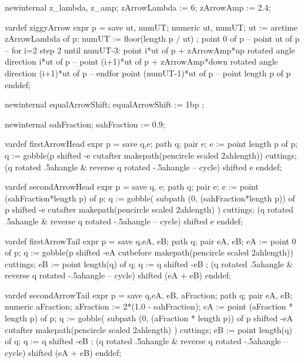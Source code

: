   newinternal z_lambda, z_amp;
  zArrowLambda := 6;   %
  zArrowAmp    := 2.4; %

  vardef ziggyArrow expr p = 
    save ut, numUT; numeric ut, numUT;    
    ut    := arctime zArrowLambda of p;
    numUT := floor(length p / ut) ;
    point 0 of p -- point ut of p --
      for i=2 step 2 until numUT-3:
        point     i*ut of p +
          zArrowAmp*up   rotated angle direction     i*ut of p --
        point (i+1)*ut of p +
          zArrowAmp*down rotated angle direction (i+1)*ut of p --
      endfor
    point (numUT-1)*ut of p -- point length p of p
  enddef;
  
  newinternal equalArrowShift;
  equalArrowShift := 1bp ;
    

  newinternal sahFraction;
  sahFraction := 0.9; %
  
  
  vardef firstArrowHead expr p =
    save q,e; path q; pair e;
    e := point length p of p;
    q := gobble(p shifted -e cutafter makepath(pencircle scaled 2ahlength))
      cuttings;
    (q rotated .5ahangle & reverse q rotated -.5ahangle -- cycle)  shifted e
  enddef;
  
  vardef secondArrowHead expr p =
    save q, e; path q; pair e;
    e := point (sahFraction*length p) of p;
    q := gobble(
      subpath (0, (sahFraction*length p)) of p shifted -e 
      cutafter makepath(pencircle scaled 2ahlength)
    ) cuttings;
    (q rotated .5ahangle & reverse q rotated -.5ahangle -- cycle)  shifted e
  enddef;
  
  vardef firstArrowTail expr p =
    save q,eA, eB; path q; pair eA, eB;
    eA := point 0 of p;
    q := gobble(p shifted -eA cutbefore makepath(pencircle scaled 2ahlength))
      cuttings;
    eB := point length(q) of q;
    q := q shifted -eB ;
    (q rotated .5ahangle & reverse q rotated -.5ahangle -- cycle)
      shifted (eA + eB)
  enddef;
  
  vardef secondArrowTail expr p =
    save q,eA, eB, aFraction; path q; pair eA, eB; numeric aFraction;
    aFraction := 2*(1.0 - sahFraction);
    eA := point (aFraction * length p) of p;
    q := gobble(
      subpath (0, (aFraction * length p)) of p shifted -eA
      cutafter makepath(pencircle scaled 2ahlength)
    ) cuttings;
    eB := point length(q) of q;
    q := q shifted -eB ;
    (q rotated .5ahangle & reverse q rotated -.5ahangle -- cycle)
      shifted (eA + eB)
  enddef;

